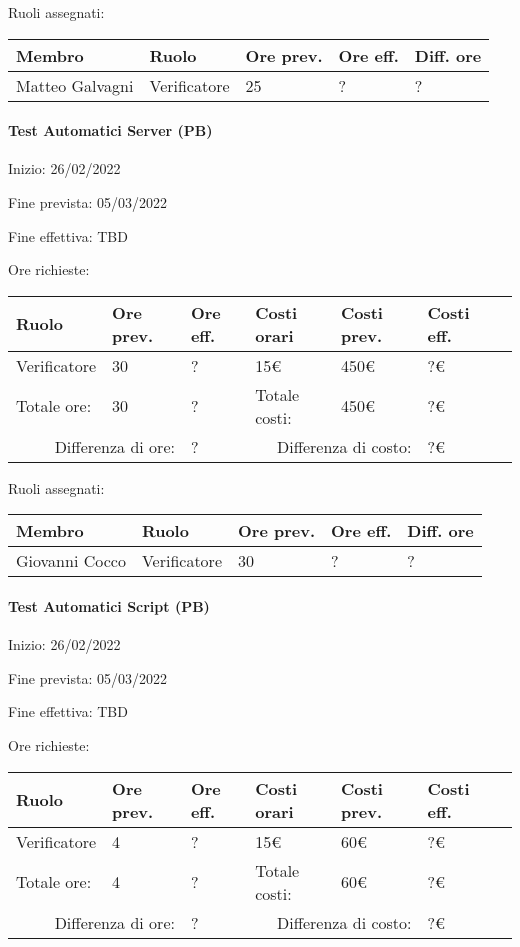 \documentclass[a4paper, 12pt]{article}
\begin{document}
Ruoli assegnati:\\[0.5em]
\begin{tabular}{|l|l|l|l|l|}\hline
Membro & Ruolo & Ore prev. & Ore eff. & Diff. ore \\\hline
Matteo Galvagni & Verificatore & 25 & ? & ? \\\hline
\end{tabular}

\paragraph{Test Automatici Server (PB)}
Inizio: 26/02/2022\par
Fine prevista: 05/03/2022\par
Fine effettiva: TBD

Ore richieste:\\[0.5em]
\begin{tabular}{|l|l|l||l|l|l|l|}\hline
Ruolo & Ore prev. & Ore eff. & Costi orari & Costi prev. & Costi eff.\\\hline
Verificatore & 30 & ? & 15\euro & 450\euro & ?\euro \\\hline
Totale ore: & 30 & ? & Totale costi: & 450\euro & ?\euro \\\hline
\multicolumn{2}{|r|}{Differenza di ore:} & ? & \multicolumn{2}{r|}{Differenza di costo:} & ?\euro \\\hline
\end{tabular}

Ruoli assegnati:\\[0.5em]
\begin{tabular}{|l|l|l|l|l|}\hline
Membro & Ruolo & Ore prev. & Ore eff. & Diff. ore \\\hline
Giovanni Cocco & Verificatore & 30 & ? & ? \\\hline
\end{tabular}

\paragraph{Test Automatici Script (PB)}
Inizio: 26/02/2022\par
Fine prevista: 05/03/2022\par
Fine effettiva: TBD

Ore richieste:\\[0.5em]
\begin{tabular}{|l|l|l||l|l|l|l|}\hline
Ruolo & Ore prev. & Ore eff. & Costi orari & Costi prev. & Costi eff.\\\hline
Verificatore & 4 & ? & 15\euro & 60\euro & ?\euro \\\hline
Totale ore: & 4 & ? & Totale costi: & 60\euro & ?\euro \\\hline
\multicolumn{2}{|r|}{Differenza di ore:} & ? & \multicolumn{2}{r|}{Differenza di costo:} & ?\euro \\\hline
\end{tabular}
\end{document}
